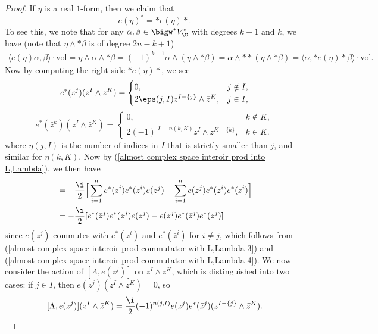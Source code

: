 \begin{proof}
If $\eta$ is a real $1$-form, then we claim that
\[e(\eta)^*=\ast e(\eta)\ast.\]
To see this, we note that for any $\alpha,\beta\in\bigw^*V^*_{\C}$ with degrees $k-1$ and $k$, we have (note that $\eta\wedge\ast\beta$ is of degree $2n-k+1$)
\begin{align*}
\langle e(\eta)\alpha,\beta\rangle\cdot\mathrm{vol}=\eta\wedge\alpha\wedge\ast\beta=(-1)^{k-1}\alpha\wedge(\eta\wedge\ast\beta)=\alpha\wedge\ast\ast(\eta\wedge\ast\beta)=\langle\alpha,\ast e(\eta)\ast\beta\rangle\cdot\mathrm{vol}.
\end{align*}
Now by computing the right side $\ast e(\eta)\ast$, we see
\begin{equation}\label{almost complex space interoir prod commutator with L,Lambda-3}
e^*(z^j)(z^I\wedge\bar{z}^K)=\begin{cases}
0,&j\notin I,\\
2\eps(j,I)z^{I-\{j\}}\wedge\bar{z}^K,&j\in I,
\end{cases}
\end{equation}
\begin{equation}\label{almost complex space interoir prod commutator with L,Lambda-4}
e^*(\bar{z}^k)(z^I\wedge\bar{z}^K)=\begin{cases}
0,&k\notin K,\\
2(-1)^{|I|+n(k,K)}z^I\wedge\bar{z}^{K-\{k\}},&k\in K.
\end{cases}
\end{equation}
where $\eta(j,I)$ is the number of indices in $I$ that is strictly smaller than $j$, and similar for $\eta(k,K)$. Now by (\ref{almost complex space interoir prod into L,Lambda}), we then have
\begin{align*}
[\Lambda,e(z^j)]&=-\frac{\i}{2}\Big[\sum_{i=1}^{n}e^*(\bar{z}^i)e^*(z^i)e(z^j)-\sum_{i=1}^{n}e(z^j)e^*(\bar{z}^i)e^*(z^i)\Big]\\
&=-\frac{\i}{2}[e^*(\bar{z}^j)e^*(z^j)e(z^j)-e(z^j)e^*(\bar{z}^j)e^*(z^j)]
\end{align*}
since $e(z^j)$ commutes with $e^*(z^i)$ and $e^*(\bar{z}^i)$ for $i\neq j$, which follows from (\ref{almost complex space interoir prod commutator with L,Lambda-3}) and (\ref{almost complex space interoir prod commutator with L,Lambda-4}). We now consider the action of $[\Lambda,e(z^j)]$ on $z^I\wedge\bar{z}^K$, which is distinguished into two cases: if $j\in I$, then $e(z^j)(z^I\wedge\bar{z}^K)=0$, so
\[[\Lambda,e(z^j)](z^I\wedge\bar{z}^K)=\frac{\i}{2}(-1)^{n(j,I)}e(z^j)e^*(\bar{z}^j)(z^{I-\{j\}}\wedge\bar{z}^K).\]

\end{proof}
